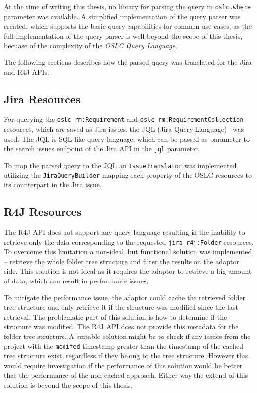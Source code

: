 At the time of writing this thesis, no library for parsing the query in \texttt{oslc.where} parameter was available. A simplified implementation of the query parser was created, which supports the basic query capabilities for common use cases, as the full implementation of the query parser is well beyond the scope of this thesis, becuase of the complexity of the \emph{OSLC Query Language}.

The following sections describes how the parsed query was translated for the Jira and R4J APIs.

\subsection*{Jira Resources}
For querying the \texttt{oslc\_rm:Requirement} and \texttt{oslc\_rm:RequirementCollection} resources, which are saved as Jira issues, the JQL (Jira Query Language) \cite{jql} was used. The JQL is SQL-like query language, which can be passed as parameter to the search issues endpoint of the Jira API in the \texttt{jql} parameter. 

To map the parsed query to the JQL an \texttt{IssueTranslator} was implemented utilizing the \texttt{JiraQueryBuilder} mapping each property of the OSLC resources to its counterpart in the Jira issue.

\subsection*{R4J Resources}
The R4J API does not support any query language resulting in the inability to retrieve only the data corresponding to the requested \texttt{jira\_r4j:Folder} resources. To overcome this limitation a non-ideal, but functional solution was implemented -- retrieve the whole folder tree structure and filter the results on the adaptor side. This solution is not ideal as it requires the adaptor to retrieve a big amount of data, which can result in performance issues. 

To mitigate the performance issue, the adaptor could cache the retrieved folder tree structure and only retrieve it if the structure was modified since the last retrieval. The problematic part of this solution is how to determine if the structure was modified. The R4J API does not provide this metadata for the folder tree structure. A suitable solution might be to check if any issues from the project with the \texttt{modifed} timestamp greater than the timestamp of the cached tree structure exist, regardless if they belong to the tree structure. However this would require investigation if the performance of this solution would be better that the performance of the non-cached approach. Either way the extend of this solution is beyond the scope of this thesis.

